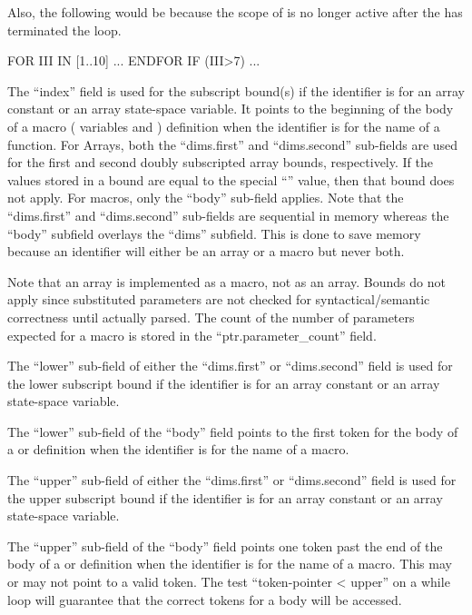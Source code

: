 Also, the following
would be 
because the scope of  is no longer active after the 
has terminated the loop.
\begin{codeexample}
FOR III IN [1..10]
    ...
ENDFOR
IF (III>7) ...
\end{codeexample}


The ``index'' field is used for the subscript bound(s)
if the identifier
is for an array constant or an array state-space variable.
It points to
the beginning of the body of
a macro ( variables and ) definition when the
identifier is for the name of a function.
For Arrays, both the ``dims.first'' and ``dims.second'' sub-fields are used for
the first and second doubly subscripted array bounds, respectively.
If the values stored in a bound are equal to
the special ``'' value, then that bound does not
apply.   For macros, only the ``body'' sub-field applies.   Note that
the ``dims.first'' and ``dims.second'' sub-fields are sequential
in memory whereas the ``body'' subfield overlays the ``dims'' subfield.
This is done to save memory because an identifier will either be an array
or a macro but never both.

Note that an  array
is implemented as a macro, not as an array.  Bounds do not apply since
substituted parameters are not checked for syntactical/semantic correctness
until actually parsed.   The count of the number of parameters expected for a
macro is stored in the ``ptr.parameter\_count'' field.

The ``lower'' sub-field of either the ``dims.first'' or ``dims.second''
field is used for the lower subscript
bound if the identifier
is for an array constant or an array state-space variable.

The ``lower'' sub-field of the ``body'' field points to the first
token for the body of a  or  definition when the
identifier is for the name of a macro.

The ``upper'' sub-field of either the ``dims.first'' or ``dims.second''
field is used for the upper subscript
bound if the identifier
is for an array constant or an array state-space variable.

The ``upper'' sub-field of the ``body'' field points one
token past the end of the body of a  or  definition when the
identifier is for the name of a macro.   This may or may not point to a valid
token.  The test ``token-pointer < upper'' on a while loop will guarantee
that the correct tokens for a body will be accessed.

